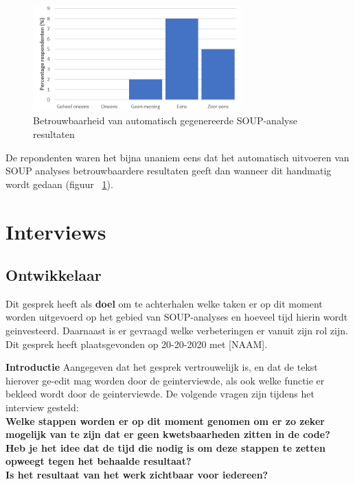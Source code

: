 \begin{figure}[bth]
    \centering
    \includegraphics[width=8cm]{gfx/appendix/Vraag5}
    \caption{Betrouwbaarheid van automatisch gegenereerde SOUP-analyse resultaten }
    \label{fig:enqueteV5}
\end{figure}

De repondenten waren het bijna unaniem eens dat het automatisch uitvoeren van SOUP analyses betrouwbaardere resultaten geeft dan wanneer dit handmatig wordt gedaan (figuur ~\ref{fig:enqueteV5}).

\clearpage
\section{Interviews}\label{sec:interviews}

\subsection{Ontwikkelaar}\label{subsec:ontwikkelaar}
Dit gesprek heeft als \textbf{doel} om te achterhalen welke taken er op dit moment worden uitgevoerd op het gebied van SOUP-analyses en hoeveel tijd hierin wordt geinvesteerd. Daarnaast is er gevraagd welke verbeteringen er vanuit zijn rol zijn. Dit gesprek heeft plaatsgevonden op 20-20-2020 met [NAAM].\smallskip

\textbf{Introductie }
Aangegeven dat het gesprek vertrouwelijk is, en dat de tekst hierover ge-edit mag worden door de geinterviewde, als ook welke functie er bekleed wordt door de geinterviewde. De volgende vragen zijn tijdens het interview gesteld:
\\
\textbf{Welke stappen worden er op dit moment genomen om er zo zeker mogelijk van te zijn dat er geen kwetsbaarheden zitten in de code? }
\\

\textbf{Heb je het idee dat de tijd die nodig is om deze stappen te zetten opweegt tegen het behaalde resultaat?}
\\

\textbf{Is het resultaat van het werk zichtbaar voor iedereen?}
\\

